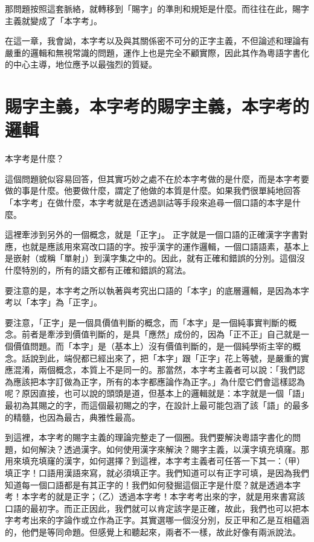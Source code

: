 \documentclass[a5paper, 10pt, openany]{book} %
\begin{document}
那問題按照這套脈絡，就轉移到「賜字」的準則和規矩是什麼。而往往在此，賜字主義就變成了「本字考」。

在這一章，我會詏，本字考以及與其關係密不可分的正字主義，不但論述和理論有嚴重的邏輯和無視常識的問題，運作上也是完全不顧實際，因此其作為粵語字書化的中心主導，地位應予以最強烈的質疑。

\section{賜字主義，本字考的賜字主義，本字考的邏輯}

本字考是什麼？

這個問題貌似容易回答，但其實巧妙之處不在於本字考做的是什麼，而是本字考要做的事是什麼。他要做什麼，謂定了他做的本質是什麼。如果我們很單純地回答「本字考」在做什麼，本字考就是在透過訓詁等手段來追尋一個口語的本字是什麼。

這裡牽涉到另外的一個概念，就是「正字」。 正字就是一個口語的正確漢字字書對應，也就是應該用來寫改口語的字。按乎漢字的運作邏輯，一個口語語素，基本上是嵌射（或稱「單射」）到漢字集之中的。因此，就有正確和錯誤的分別。這個沒什麼特別的，所有的語文都有正確和錯誤的寫法。

要注意的是，本字考之所以執著與考究出口語的「本字」的底層邏輯，是因為本字考以「本字」為「正字」。

要注意，「正字」是一個具價值判斷的概念，而「本字」是一個純事實判斷的概念。前者是牽涉到價值判斷的，是具「應然」成份的，因為「正不正」自己就是一個價值問題。而「本字」是（基本上）沒有價值判斷的，是一個純學術主宰的概念。話說到此，端倪都已經出來了，把「本字」跟「正字」花上等號，是嚴重的實應混淆，兩個概念，本質上不是同一的。那當然，本字考主義者可以說：「我們認為應該把本字訂做為正字，所有的本字都應論作為正字。」為什麼它們會這樣認為呢？原因直接，也可以說的頭頭是道，但基本上的邏輯就是：本字就是一個「語」最初為其賜之的字，而這個最初賜之的字，在設計上最可能包涵了該「語」的最多的精髓，也因為最古，典雅性最高。

到這裡，本字考的賜字主義的理論完整走了一個圈。我們要解決粵語字書化的問題，如何解決？透過漢字。如何使用漢字來解決？賜字主義，以漢字填充填窿。那用來填充填窿的漢字，如何選擇？到這裡，本字考主義者可任答一下其一：（甲）填正字！口語用漢語來寫，就必須填正字。我們知道可以有正字可填，是因為我們知道每一個口語都是有其正字的！我們如何發掘這個正字是什麼？就是透過本字考！本字考的就是正字；（乙）透過本字考！本字考考出來的字，就是用來書寫該口語的最初字。而正正因此，我們就可以肯定該字是正確，故此，我們也可以把本字考考出來的字論作或立作為正字。其實選哪一個沒分別，反正甲和乙是互相蘊涵的，他們是等同命題。但感覺上和聽起來，兩者不一樣，故此好像有兩派說法。
\end{document}
